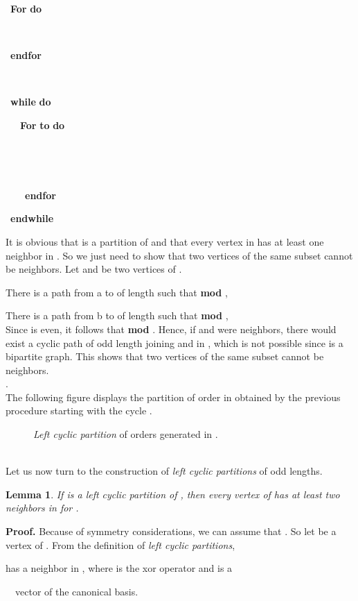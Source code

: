\documentclass{article}
\newtheorem{lemma}{Lemma}
\begin{document}
\ {\bf For}   {\bf do}

\ \ \ 

\ {\bf endfor}

\ 

\ {\bf while}  {\bf do}

\ \ \ {\bf For }  {\bf to }   {\bf do}

\ \ \ \ \hspace{2mm} 

\ \ \ \ \hspace{2mm} 

\ \ \ \ {\bf endfor}

\ {\bf endwhile}

It is obvious that  is a partition of  and that every
vertex in  has at least one neighbor in . So we just need to show
that two vertices of the same subset  cannot be neighbors. Let  and
 be two vertices of .

 There is a path from a to  of length  such that  {\bf  mod },

 There is a path from b to  of length  such that  {\bf  mod },\\
Since  is  even, it follows that  {\bf mod }. Hence, if
 and  were neighbors, there would exist a cyclic path of odd length
 joining  and  in , which is not possible
since  is a bipartite graph. This shows that two vertices of the same
subset cannot be neighbors.\\
.\\
The following figure displays the partition of order  in  obtained by
the previous procedure starting with the cycle .
\begin{figure}[htbp]
\centering
\epsfxsize=6cm
\caption{\label{tracegraph} {\em Left cyclic partition} of orders  generated in .}
\end{figure}\\
Let us now turn to the construction of {\em left cyclic partitions} of odd
lengths.

\begin{lemma}  \label{lem:23}
If  is a {\em left cyclic partition} of , then every vertex
of  has at least two neighbors in  for .
\end{lemma}
{\bf Proof.} Because of symmetry considerations, we can assume that . So
let  be a vertex of . From the definition of {\em left cyclic
  partitions},

 
has a neighbor  in , where  is the {\sc xor}
operator and  is a

\ \ vector of the canonical basis.
\end{document}
